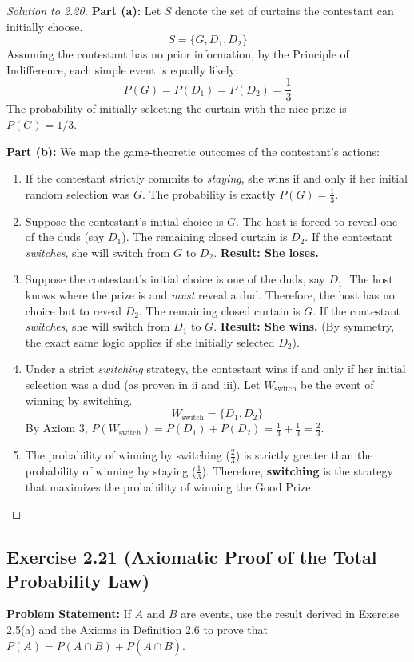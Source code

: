 \documentclass[12pt]{article}
\begin{document}
\begin{proof}[Solution to 2.20]
\textbf{Part (a):} Let $S$ denote the set of curtains the contestant can initially choose. 
\[ S = \{ G, D_1, D_2 \} \]
Assuming the contestant has no prior information, by the Principle of Indifference, each simple event is equally likely:
\[ P(G) = P(D_1) = P(D_2) = \frac{1}{3} \]
The probability of initially selecting the curtain with the nice prize is $P(G) = 1/3$.

\textbf{Part (b):} We map the game-theoretic outcomes of the contestant's actions:
\begin{enumerate}
    \item[i.] If the contestant strictly commits to \textit{staying}, she wins if and only if her initial random selection was $G$. The probability is exactly $P(G) = \frac{1}{3}$.
    \item[ii.] Suppose the contestant's initial choice is $G$. The host is forced to reveal one of the duds (say $D_1$). The remaining closed curtain is $D_2$. If the contestant \textit{switches}, she will switch from $G$ to $D_2$. \textbf{Result: She loses.}
    \item[iii.] Suppose the contestant's initial choice is one of the duds, say $D_1$. The host knows where the prize is and \textit{must} reveal a dud. Therefore, the host has no choice but to reveal $D_2$. The remaining closed curtain is $G$. If the contestant \textit{switches}, she will switch from $D_1$ to $G$. \textbf{Result: She wins.} (By symmetry, the exact same logic applies if she initially selected $D_2$).
    \item[iv.] Under a strict \textit{switching} strategy, the contestant wins if and only if her initial selection was a dud (as proven in ii and iii). Let $W_{\text{switch}}$ be the event of winning by switching. 
    \[ W_{\text{switch}} = \{ D_1, D_2 \} \]
    By Axiom 3, $P(W_{\text{switch}}) = P(D_1) + P(D_2) = \frac{1}{3} + \frac{1}{3} = \frac{2}{3}$.
    \item[v.] The probability of winning by switching ($\frac{2}{3}$) is strictly greater than the probability of winning by staying ($\frac{1}{3}$). Therefore, \textbf{switching} is the strategy that maximizes the probability of winning the Good Prize.
\end{enumerate}
\end{proof}

\subsection*{Exercise 2.21 (Axiomatic Proof of the Total Probability Law)}
\textbf{Problem Statement:} If $A$ and $B$ are events, use the result derived in Exercise 2.5(a) and the Axioms in Definition 2.6 to prove that $P(A) = P(A \cap B) + P(A \cap \overline{B})$.
\end{document}
